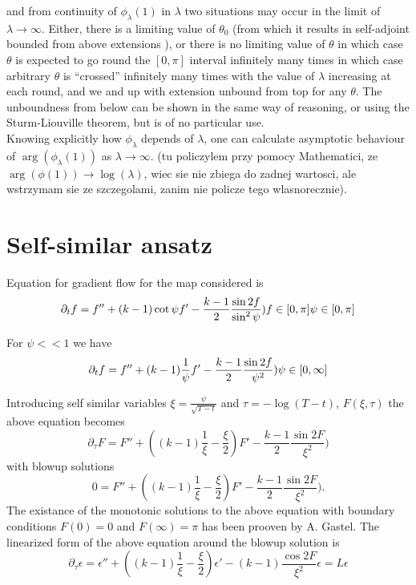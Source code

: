 \documentclass[
a4paper,%
10pt,%
titlepage,%
twoside%
]{article}
\begin{document}
and from continuity of $\phi_\lambda(1)$ in $\lambda$ two situations
may occur in the limit of $\lambda\rightarrow\infty$. Either, there is
a limiting value of $\theta_0$ (from which it results in self-adjoint
bounded from above extensions ), or there is no limiting value of
$\theta$ in which case $\theta$ is expected to go round the $[0,\pi]$
interval infinitely many times in which case arbitrary $\theta$ is
``crossed'' infinitely many times with the value of $\lambda$
increasing at each round, and we and up with extension unbound from
top for any $\theta$. The unboundness from below can be shown in the
same way of reasoning, or using the Sturm-Liouville theorem, but is of
no particular use.
\\
Knowing explicitly how $\phi_\lambda$ depends of $\lambda$, one can
calculate asymptotic behaviour of $\arg(\phi_\lambda(1))$ as
$\lambda\rightarrow\infty$. (tu policzylem przy pomocy Mathematici, ze
$\arg(\phi(1))\rightarrow\log(\lambda)$, wiec sie nie zbiega do zadnej
wartosci, ale wstrzymam sie ze szczegolami, zanim nie policze tego
wlasnorecznie).

\section{Self-similar ansatz}


Equation for gradient flow for the map considered is
\begin{equation}
  \label{eq:grad_flow}
  \partial_t f=f''+(k-1)\cot \psi f'-\frac{k-1}{2}\frac{\sin2f}{\sin^2 \psi})\\
  f\in [0,\pi]\\
  \psi\in [0,\pi]
\end{equation}


For $\psi<<1$ we have
\begin{equation}
  \partial_t f=f''+(k-1)\frac{1}{\psi} f'-\frac{k-1}{2}\frac{\sin2f}{\psi^2})\\
  \psi\in [0,\infty]
\end{equation}

Introducing self similar variables $\xi=\frac{\psi}{\sqrt{T-t}}$ and
$\tau=-\log(T-t)$, $F(\xi,\tau)$ the above equation becomes
\begin{equation}
  \partial_\tau F=F''+((k-1)\frac{1}{\xi}-\frac{\xi}{2}) F'-\frac{k-1}{2}\frac{\sin2F}{\xi^2})
\end{equation}
with blowup solutions
\begin{equation}
  0=F''+((k-1)\frac{1}{\xi}-\frac{\xi}{2}) F'-\frac{k-1}{2}\frac{\sin2F}{\xi^2}).
\end{equation}
The existance of the monotonic solutions to the above equation with
boundary conditions $F(0)=0$ and $F(\infty)=\pi$ has been prooven by
A. Gastel. The linearized form of the above equation around the blowup
solution is
\begin{equation}
  \partial_\tau \epsilon=\epsilon''+((k-1)\frac{1}{\xi}-\frac{\xi}{2}) \epsilon'-(k-1)\frac{\cos2F}{\xi^2}\epsilon=L\epsilon
\end{equation}
\end{document}
